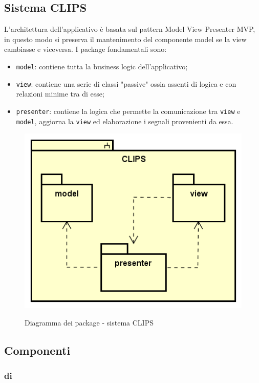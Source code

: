 \documentclass[../DefinizioneDiProdotto.tex]{subfiles}
\begin{document}
	\subsection{Sistema CLIPS}
		L'architettura dell'applicativo è basata sul pattern Model View Presenter MVP, in questo modo si preserva il mantenimento del componente model se la view cambiasse e viceversa. I package fondamentali sono:
		\begin{itemize}
			\item \verb|model|: contiene tutta la business logic dell'applicativo;
			\item \verb|view|: contiene una serie di classi "passive" ossia assenti di logica e con relazioni minime tra di esse;
			\item \verb|presenter|: contiene la logica che permette la comunicazione tra \verb|view| e \verb|model|, aggiorna la \verb|view| ed elaborazione i segnali provenienti da essa.
		\end{itemize}
		
		\begin{figure} [h]
			\centering
			\includegraphics[scale=0.8]{img/package/CLIPS}
			\label{CLIPS}
			\caption{Diagramma dei package - sistema CLIPS}
		\end{figure}
		
	
\subsection{Componenti}

\subsubsection{di}
\end{document}
